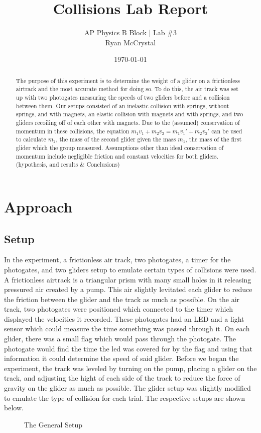 \documentclass[12pt]{article}
\title{Collisions Lab Report}
\author{AP Physics B Block | Lab \#3\\Ryan McCrystal}
\date{\today}
\begin{document}
\maketitle
\newpage

\begin{abstract}
The purpose of this experiment is to determine the weight of a glider on a frictionless airtrack and the most accurate method for doing so. To do this, the air track was set up with two photogates measuring the speeds of two gliders before and a collision between them. Our setups consisted of an inelastic collision with springs, without springs, and with magnets, an elastic collision with magnets and with springs, and two gliders recoiling off of each other with magnets. Due to the (assumed) conservation of momentum in these collisions, the equation $m_1v_1+m_2v_2=m_1v_1'+m_2v_2'$ can be used to calculate $m_2$, the mass of the second glider given the mass $m_1$, the mass of the first glider which the group measured. Assumptions other than ideal conservation of momentum include negligible friction and constant velocities for both gliders. (hypothesis, and results \& Conclusions) %
\end{abstract}
\newpage

\section{Approach}

\subsection{Setup}
In the experiment, a frictionless air track, two photogates, a timer for the photogates, and two gliders setup to emulate certain types of collisions were used. A frictionless airtrack is a triangular prism with many small holes in it releasing pressured air created by a pump. This air slightly levitated each glider to reduce the friction between the glider and the track as much as possible. On the air track, two photogates were positioned which connected to the timer which displayed the velocities it recorded. These photogates had an LED and a light sensor which could measure the time something was passed through it. On each glider, there was a small flag which would pass through the photogate. The photogate would find the time the led was covered for by the flag and using that information it could determine the speed of said glider. Before we began the experiment, the track was leveled by turning on the pump, placing a glider on the track, and adjusting the hight of each side of the track to reduce the force of gravity on the glider as much as possible. The glider setup was slightly modified to emulate the type of collision for each trial. The respective setups are shown below.
\begin{figure}[H]
    \centering
    \caption{The General Setup}
\end{figure}
\end{document}
